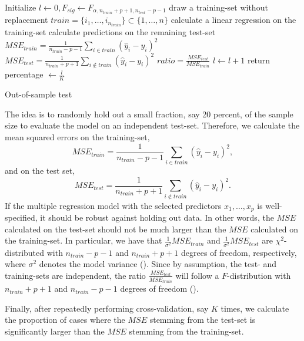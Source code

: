 \documentclass[a4paper, 12pt]{scrreprt}
\begin{document}
\begin{algorithm} 

Initialize $l \gets 0, F_{sig} \gets F_{\alpha, n_{train} + p + 1, n_{test} - p - 1}$ \;
	{
		draw a training-set without replacement $train = \{ i_1,\ldots,i_{n_{train}} \} \subset \{ 1,\ldots,n \}$ \;
		calculate a linear regression on the training-set \;
		calculate predictions on the remaining test-set \;
		$MSE_{train} = \frac{1}{n_{train} - p - 1} \sum_{i \in train} (\hat{y}_{i} - y_{i})^2 $ \;
		$MSE_{test} = \frac{1}{n_{train} + p + 1} \sum_{i \notin train} (\hat{y}_i - y_i)^2 $\;
		$ratio = \frac{MSE_{test}}{MSE_{train}}$ \;
		   {
		   $l \gets l+1$	\; 
		   }
	}
return percentage $\gets \frac{l}{K}$\;
\caption{Out-of-sample test}
\label{algo:outofsampletest}
\end{algorithm}

The idea is to randomly hold out a small fraction, say 20 percent, of the sample size to evaluate the model on an independent test-set. Therefore, we calculate the mean squared errors on the training-set,
\[ 
MSE_{train} = \frac{1}{n_{train} - p - 1} \sum_{i \in train} (\hat{y}_{i} - y_{i})^2,
\]
and on the test set,
\[ 
MSE_{test} = \frac{1}{n_{train} + p + 1} \sum_{i \notin train} (\hat{y}_i - y_i)^2.
\]
If the multiple regression model with the selected predictors $x_1, \ldots, x_p$ is well-specified, it should be robust against holding out data. In other words, the $MSE$ calculated on the test-set should not be much larger than the $MSE$ calculated on the training-set. In particular, we have that $\frac{1}{\sigma^2} MSE_{train}$ and $\frac{1}{\sigma^2} MSE_{test}$ are $\chi^2$-distributed with $n_{train}-p-1$ and $n_{train}+p+1$ degrees of freedom, respectively, where $\sigma^2$ denotes the model variance (\textcite{trippa2015bayesian}).
Since by assumption, the test- and training-sets are independent, the ratio $\frac{MSE_{test}}{MSE_{train}}$ will follow a $F$-distribution with $n_{train} + p + 1$ and $n_{train}-p-1$ degrees of freedom (\textcite[chapter 9.7]{degroot2014probability}).

Finally, after repeatedly performing cross-validation, say $K$ times, we calculate the proportion of cases where the $MSE$ stemming from the test-set is significantly larger than the $MSE$ stemming from the training-set.
\end{document}
